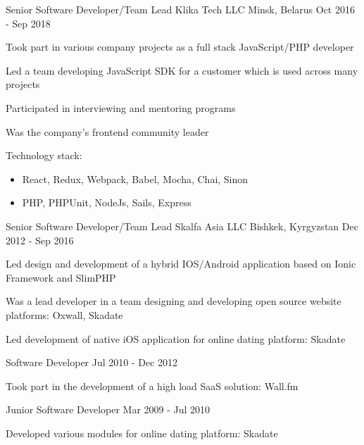 \begin{cventries}
  \cventry
    {Senior Software Developer/Team Lead} %
    {Klika Tech LLC} %
    {Minsk, Belarus} %
    {Oct 2016 - Sep 2018} %
    {
      \begin{cvitems}
        \item Took part in various company projects as a full stack JavaScript/PHP developer
        \item Led a team developing JavaScript SDK for a customer which is used across many projects
        \item Participated in interviewing and mentoring programs
        \item Was the company's frontend community leader
      \end{cvitems}
      \vspace{5mm}
      Technology stack:
      \begin{itemize}[leftmargin=2ex, nosep, noitemsep]
        \item React, Redux, Webpack, Babel, Mocha, Chai, Sinon
        \item PHP, PHPUnit, NodeJs, Sails, Express
      \end{itemize}
      \vspace{-4.0mm}
    }

  \cventry
    {Senior Software Developer/Team Lead} %
    {Skalfa Asia LLC} %
    {Bishkek, Kyrgyzstan} %
    {Dec 2012 - Sep 2016} %
    {
      \begin{cvitems}
        \item Led design and development of a hybrid IOS/Android application based on Ionic Framework and SlimPHP
        \item Was a lead developer in a team designing and developing open source website platforms: Oxwall, Skadate
        \item Led development of native iOS application for online dating platform: Skadate
      \end{cvitems}
    }

  \cventry
    {Software Developer} %
    {} %
    {} %
    {Jul 2010 - Dec 2012} %
    {
      \begin{cvitems}
        \item Took part in the development of a high load SaaS solution: Wall.fm
      \end{cvitems}
    }

  \cventry
    {Junior Software Developer} %
    {} %
    {} %
    {Mar 2009 - Jul 2010} %
    {
      \begin{cvitems}
        \item Developed various modules for online dating platform: Skadate
      \end{cvitems}
    }

\end{cventries}
